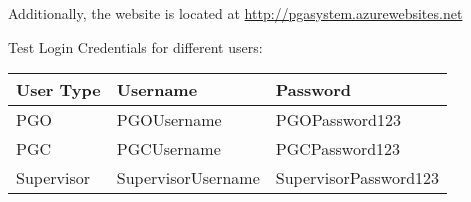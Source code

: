 \documentclass[11pt]{article}
\begin{document}
Additionally, the website is located at \href{http://pgasystem.azurewebsites.net}{http://pgasystem.azurewebsites.net}

Test Login Credentials for different users:
\begin{table}[H]
	\begin{tabular}{|l||l|l|}
		\hline
		User Type  & Username           & Password              \\ \hline
		PGO        & PGOUsername        & PGOPassword123        \\ \hline
		PGC        & PGCUsername        & PGCPassword123        \\ \hline
		Supervisor & SupervisorUsername & SupervisorPassword123 \\ \hline
	\end{tabular}
\end{table}
\end{document}

